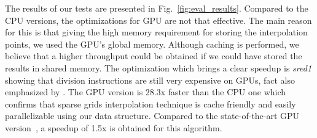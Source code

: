 The results of our tests are presented in Fig.~\ref{fig:eval_results}. Compared
to the CPU versions, the optimizations for GPU are not that effective. The main
reason for this is that giving the high memory requirement for storing the
interpolation points, we used the GPU's global memory. Although caching is
performed, we believe that a higher throughput could be obtained if we could
have stored the results in shared memory. The optimization which brings a clear
speedup is \textit{sred1} showing that division instructions are still very
expensive on GPUs, fact also emphasized by \cite{cuda}. The GPU version is 28.3x
faster than the CPU one which confirms that sparse grids interpolation technique
is cache friendly and easily parallelizable using our data structure. Compared
to the state-of-the-art GPU version~\cite{Murarasu:2011:CDS:1941553.1941559}, a
speedup of 1.5x is obtained for this algorithm.
